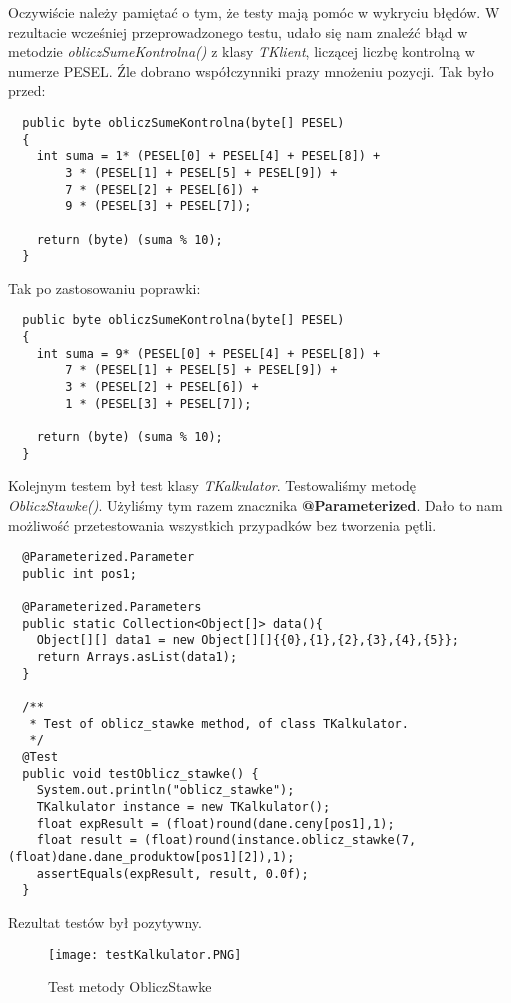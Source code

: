 \documentclass{article}
\begin{document}
Oczywiście należy pamiętać o tym, że testy mają pomóc w wykryciu błędów. W rezultacie wcześniej przeprowadzonego testu, udało się nam znaleźć błąd w metodzie \textit{obliczSumeKontrolna()} z klasy \textit{TKlient}, liczącej liczbę kontrolną w numerze PESEL. Źle dobrano współczynniki prazy mnożeniu pozycji. Tak było przed: 
\begin{verbatim}
  public byte obliczSumeKontrolna(byte[] PESEL)
  {
    int suma = 1* (PESEL[0] + PESEL[4] + PESEL[8]) +
        3 * (PESEL[1] + PESEL[5] + PESEL[9]) + 
        7 * (PESEL[2] + PESEL[6]) +
        9 * (PESEL[3] + PESEL[7]);
        
    return (byte) (suma % 10);
  }
\end{verbatim}
Tak po zastosowaniu poprawki:
\begin{verbatim}
  public byte obliczSumeKontrolna(byte[] PESEL)
  {
    int suma = 9* (PESEL[0] + PESEL[4] + PESEL[8]) +
        7 * (PESEL[1] + PESEL[5] + PESEL[9]) + 
        3 * (PESEL[2] + PESEL[6]) +
        1 * (PESEL[3] + PESEL[7]);
        
    return (byte) (suma % 10);
  }
\end{verbatim}
Kolejnym testem był test klasy \textit{TKalkulator}. Testowaliśmy metodę \textit{ObliczStawke()}. Użyliśmy tym razem znacznika \textbf{@Parameterized}. Dało to nam możliwość przetestowania wszystkich przypadków bez tworzenia pętli.
\begin{verbatim}
  @Parameterized.Parameter
  public int pos1;
  
  @Parameterized.Parameters
  public static Collection<Object[]> data(){
    Object[][] data1 = new Object[][]{{0},{1},{2},{3},{4},{5}};
    return Arrays.asList(data1);
  }

  /**
   * Test of oblicz_stawke method, of class TKalkulator.
   */
  @Test
  public void testOblicz_stawke() {
    System.out.println("oblicz_stawke");
    TKalkulator instance = new TKalkulator();
    float expResult = (float)round(dane.ceny[pos1],1);
    float result = (float)round(instance.oblicz_stawke(7, (float)dane.dane_produktow[pos1][2]),1);
    assertEquals(expResult, result, 0.0f);
  }  
\end{verbatim}
Rezultat testów był pozytywny.
\begin{figure}[!ht]
\centering
\texttt{[image: testKalkulator.PNG]}
\caption{Test metody ObliczStawke}
\end{figure}
\end{document}
